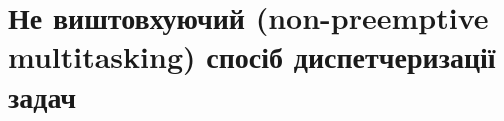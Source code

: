 \section{Не виштовхуючий (non-preemptive multitasking) спосіб диспетчеризації задач}
\label{sec:multitasking}
